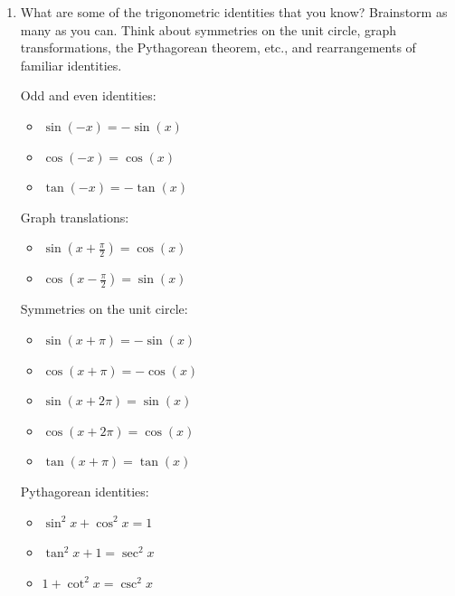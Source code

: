 \documentclass{article}
\begin{document}
\begin{enumerate}
\begin{solution}
Plugging $x= \dfrac{100}{\sqrt{3} -1}$ into either equation above equal to $h$ will yield the height of the building:
\begin{center}
    $\dfrac{100\sqrt{3}}{\sqrt{3} -1}= h$ \hspace{1cm} or \hspace{1cm} $\dfrac{100}{\sqrt{3} -1} + 100 = h$ 
\end{center}
(These two representations of $h$ look quite different but are the same value!)
\end{solution}

\item 
\begin{problem}
What are some of the trigonometric identities that you know? Brainstorm as many as you can. Think about symmetries on the unit circle, graph transformations, the Pythagorean theorem, etc., and rearrangements of familiar identities.
\end{problem}

\begin{solution}
Odd and even identities:
    \begin{itemize}
        \item $\sin(-x)=-\sin(x)$
        \item $\cos(-x)=\cos(x)$
        \item $\tan(-x)=-\tan(x)$
    \end{itemize}

Graph translations:
\begin{itemize}
    \item $\sin(x+\frac{\pi}{2})=\cos(x)$
    \item $\cos(x-\frac{\pi}{2})=\sin(x)$
\end{itemize}

Symmetries on the unit circle:
\begin{itemize}
    \item $\sin(x+\pi) = -\sin(x)$
    \item $\cos(x+\pi)=-\cos(x)$
    \item $\sin(x+2\pi) = \sin(x)$
    \item $\cos(x+2\pi) = \cos(x)$
    \item $\tan(x+\pi) = \tan(x)$
\end{itemize}

Pythagorean identities:
\begin{itemize}
    \item $\sin^2 x + \cos^2 x =1$
    \item $\tan ^2 x + 1 = \sec^2 x$
    \item $1 + \cot^2x = \csc^2 x$
\end{itemize}


\end{solution}
\end{enumerate}
\end{document}
